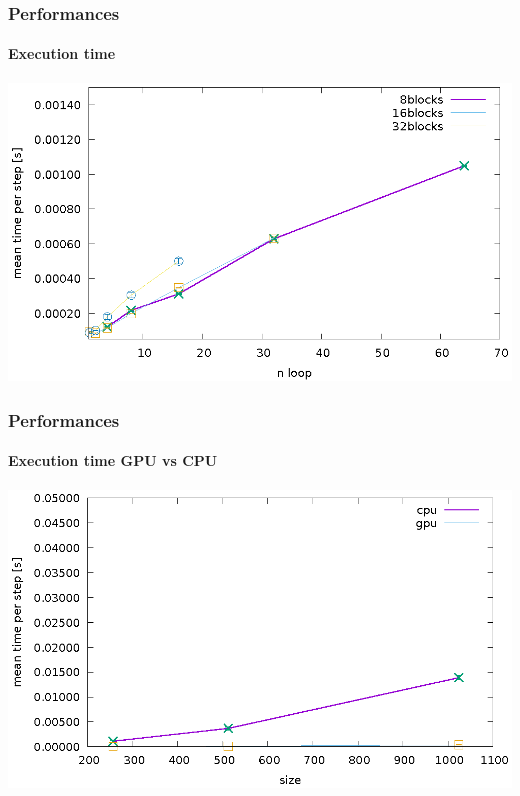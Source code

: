 \begin{frame}
\frametitle{Performances}
\framesubtitle{Execution time}
\begin{center}
\includegraphics[width = \textwidth]{../check/time/speed1.eps}
\end{center}
\end{frame}

\begin{frame}
\frametitle{Performances}
\framesubtitle{Execution time GPU vs CPU}
\begin{center}
\includegraphics[width = \textwidth]{../check/cpu/speed1.eps}
\end{center}
\end{frame}

